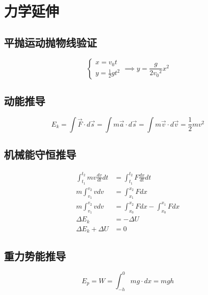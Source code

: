 
\section{力学延伸}

\subsection{平抛运动抛物线验证}

\begin{equation*}
    \begin{cases}
        x=v_0t\\
        y=\frac12gt^2
    \end{cases}\implies
    y=\frac{g}{2{v_0}^2}x^2
\end{equation*}

\subsection{动能推导}

\begin{equation*}
    E_k=\int\vec{F}\cdot d\vec{s}
        =\int m\vec{a}\cdot d\vec{s}
        =\int m\vec{v}\cdot d\vec{v}
        =\frac12mv^2
\end{equation*}

\subsection{机械能守恒推导}

\begin{align*}
    \int_{t_1}^{t_2}mv\frac{dv}{dt}dt&=\int_{t_1}^{t_2}F\frac{dx}{dt}dt\\
    m\int_{v_1}^{v_2}vdv&=\int_{x_1}^{x_2}Fdx\\
    m\int_{v_1}^{v_2}vdv&=\int_{x_0}^{x_2}Fdx-\int_{x_0}^{x_1}Fdx\\
    \Delta E_k&=-\Delta U\\
    \Delta E_k+\Delta U&=0
\end{align*}

\subsection{重力势能推导}

\begin{equation*}
    E_p=W=\int_{-h}^0mg\cdot dx=mgh
\end{equation*}


